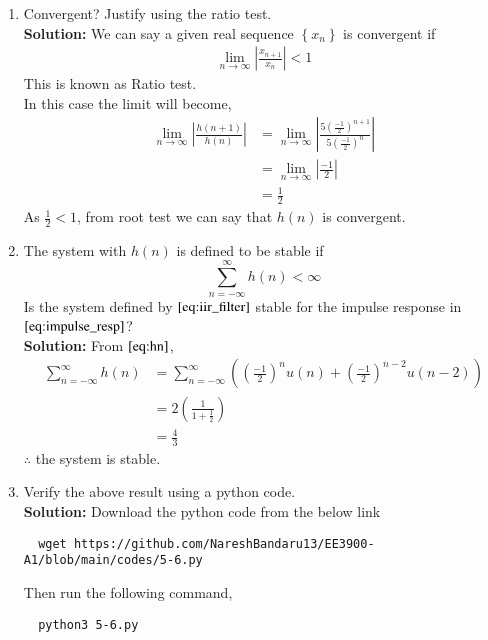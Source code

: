\documentclass[journal,12pt,twocolumn]{IEEEtran}
\renewcommand\thesection{\arabic{section}}
\newcommand{\solution}{\noindent \textbf{Solution: }}
\providecommand{\brak}[1]{\ensuremath{\left(#1\right)}}
\providecommand{\cbrak}[1]{\ensuremath{\left\{#1\right\}}}
\providecommand{\abs}[1]{\left\vert#1\right\vert}
\numberwithin{equation}{section}
\renewcommand\thesection{\arabic{section}}
\begin{document}
\begin{enumerate}[label=\thesection.\arabic*]
     
\item Convergent? Justify using the ratio test.\\
     \solution We can say a given real sequence $\cbrak{x_n}$ is convergent if 
       \begin{align}
         \lim_{n \rightarrow \infty}\abs{\frac{x_{n+1}}{x_n}} < 1
       \end{align}
        This is known as Ratio test.\\
      In this case the limit will become,
       \begin{align}
         \lim_{n \rightarrow \infty}\abs{\frac{h\brak{n+1}}{h\brak{n}}} &= \lim_{n \rightarrow \infty}\abs{\frac{5\brak{\frac{-1}{2}}^{n+1}}{5\brak{\frac{-1}{2}}^{n}}} \\
          &= \lim_{n \rightarrow \infty}\abs{\frac{-1}{2}}\\
          &= \frac{1}{2}
       \end{align}
      As $\frac{1}{2} < 1$, from root test we can say that $h\brak{n}$ is convergent.
      
\item The system with $h(n)$ is defined to be stable if
     \begin{equation}
      \sum_{n=-\infty}^{\infty}h(n) < \infty
     \end{equation}
        Is the system defined by $\eqref{eq:iir_filter}$ stable for the impulse response in $\eqref{eq:impulse_resp}$?\\
        
\solution From $\eqref{eq:hn}$,
      \begin{align}
        \sum_{n=-\infty}^{\infty}h\brak{n} &= \sum_{n=-\infty}^{\infty}\brak{\brak{\frac{-1}{2}}^{n} u\brak{n} + \brak{\frac{-1}{2}}^{n-2} u\brak{n-2}}\\
                                           &= 2\brak{\frac{1}{1+\frac{1}{2}}}\\
                                           &= \frac{4}{3}
      \end{align}
       $\therefore$ the system is stable. 
        
\item Verify the above result using a python code.\\
\solution Download the python code from the below link 
    \begin{lstlisting}
  wget https://github.com/NareshBandaru13/EE3900-A1/blob/main/codes/5-6.py
    \end{lstlisting}
  Then run the following command,
    \begin{lstlisting}
  python3 5-6.py
    \end{lstlisting} 
   

\end{enumerate}
\end{document}
